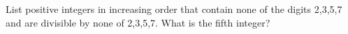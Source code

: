 List positive integers in increasing order that contain none of the digits 2,3,5,7 and are divisible by none of 2,3,5,7. What is the fifth integer?
